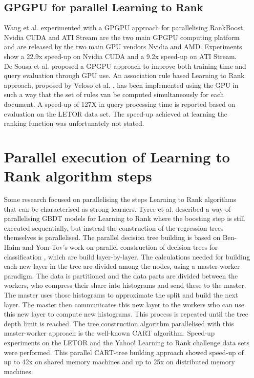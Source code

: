\subsection{GPGPU for parallel Learning to Rank}
Wang et al. \cite{Wang2009} experimented with a \ac{GPGPU} approach for parallelising RankBoost. Nvidia \ac{CUDA} and ATI Stream are the two main \ac{GPGPU} computing platform and are released by the two main \ac{GPU} vendors Nvidia and AMD. Experiments show a 22.9x speed-up on Nvidia \ac{CUDA} and a 9.2x speed-up on ATI Stream.\\

De Sousa et al. \cite{DeSousa2012} proposed a \ac{GPGPU} approach to improve both training time and query evaluation through \ac{GPU} use. An association rule based Learning to Rank approach, proposed by Veloso et al. \cite{Veloso2008}, has been implemented using the \ac{GPU} in such a way that the set of rules van be computed simultaneously for each document. A speed-up of 127X in query processing time is reported based on evaluation on the LETOR data set. The speed-up achieved at learning the ranking function was unfortunately not stated.\\

\section{Parallel execution of Learning to Rank algorithm steps}
Some research focused on parallelising the steps Learning to Rank algorithms that can be characterised as strong learners. Tyree et al. \cite{Tyree2011} described a way of parallelising \ac{GBDT} models for Learning to Rank where the boosting step is still executed sequentially, but instead the construction of the regression trees themselves is parallelised. The parallel decision tree building is based on Ben-Haim and Yom-Tov's work on parallel construction of decision trees for classification \cite{Ben-Haim2010}, which are build layer-by-layer. The calculations needed for building each new layer in the tree are divided among the nodes, using a master-worker paradigm. The data is partitioned and the data parts are divided between the workers, who compress their share into histograms and send these to the master. The master uses those histograms to approximate the split and build the next layer. The master then communicates this new layer to the workers who can use this new layer to compute new histograms. This process is repeated until the tree depth limit is reached. The tree construction algorithm parallelised with this master-worker approach is the well-known \ac{CART} \cite{Breiman1984} algorithm. Speed-up experiments on the LETOR and the Yahoo! Learning to Rank challenge data sets were performed. This parallel \ac{CART}-tree building approach showed speed-up of up to 42x on shared memory machines and up to 25x on distributed memory machines.\\

